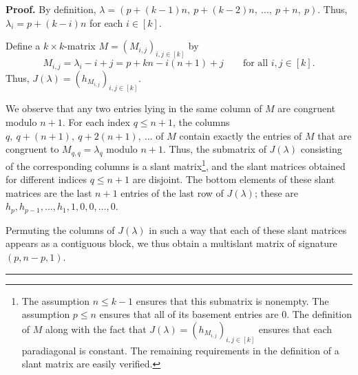 \documentclass[numbers=enddot,12pt,final,onecolumn,notitlepage]{scrartcl}%
\theoremstyle{definition}
\newenvironment{proof}[1][Proof]{\noindent\textbf{#1.} }{\ \rule{0.5em}{0.5em}}
\newcommand{\tup}[1]{\left( #1 \right)}
\renewcommand{\leq}{\leqslant}
\theoremstyle{plainsl}
\begin{document}
\begin{proof}
By definition,
$\lambda = (p+(k-1)n,\ p+(k-2)n,\ \ldots,\ p+n,\ p)$.
Thus, $\lambda_i = p + (k-i)n$ for each $i \in [k]$.

Define a $k\times k$-matrix $M = \tup{M_{i,j}}_{i,j\in[k]}$
by
\[
M_{i,j} = \lambda_{i}-i+j
= p + kn - i\tup{n+1} + j
\qquad \text{for all $i,j\in[k]$.}
\]
Thus, $J(\lambda) = \left( h_{M_{i,j}} \right)_{i,j \in [k]}$.

We observe that any two entries lying in the same column
of $M$ are congruent modulo $n+1$.
For each index $q \leq n+1$,
the columns $q,\ q+(n+1),\ q+2(n+1),\ \ldots$ of $M$
contain exactly the entries of $M$ that are congruent to $M_{q,q} = \lambda_q$ modulo $n+1$.
Thus, the submatrix of $J(\lambda)$ consisting of
the corresponding columns is a slant matrix\footnote{The
assumption $n \leq k-1$ ensures that this submatrix
is nonempty. The assumption $p \leq n$ ensures that all
of its basement entries are $0$. The definition of $M$
along with the fact that
$J(\lambda) = \left( h_{M_{i,j}} \right)_{i,j \in [k]}$
ensures that each paradiagonal is constant. The remaining
requirements in the definition of a slant matrix are easily
verified.}, and the slant matrices obtained for different
indices $q \leq n+1$ are disjoint.
The bottom elements of these slant matrices are the last $n+1$
entries of the last row of $J(\lambda)$; these are
$h_p, h_{p-1}, \ldots, h_1, 1, 0, 0, \ldots, 0$.

Permuting the columns of $J(\lambda)$ in such a way that
each of these slant matrices appears as a contiguous block,
we thus obtain a multislant matrix of signature
$(p, n-p, 1)$.
%
%
%
%
%
\end{proof}
\end{document}
